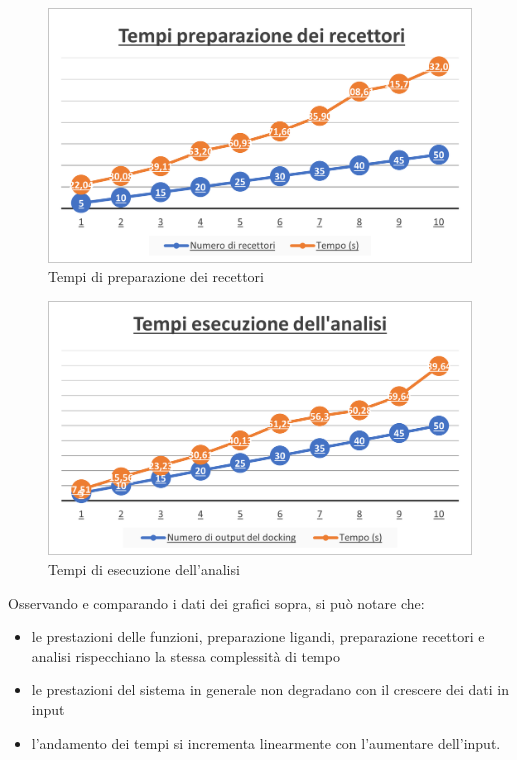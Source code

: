 \begin{figure}[H]
    \centering
    \includegraphics{immagini/capitolo4/tempiRecettori.png}
    \caption{Tempi di preparazione dei recettori}
    \label{fig:tempi recettori}
\end{figure}

\begin{figure}[H]
    \centering
    \includegraphics{immagini/capitolo4/tempiAnalisi.png}
    \caption{Tempi di esecuzione dell'analisi}
    \label{fig:tempi analisi}
\end{figure}

Osservando e comparando i dati dei grafici sopra, si può notare che:

\begin{itemize}
    \item le prestazioni delle funzioni, preparazione ligandi, preparazione recettori e analisi rispecchiano la stessa complessità di tempo
    \item le prestazioni del sistema in generale non degradano con il crescere dei dati in input
    \item l'andamento dei tempi si incrementa linearmente con l'aumentare dell'input.
\end{itemize}

